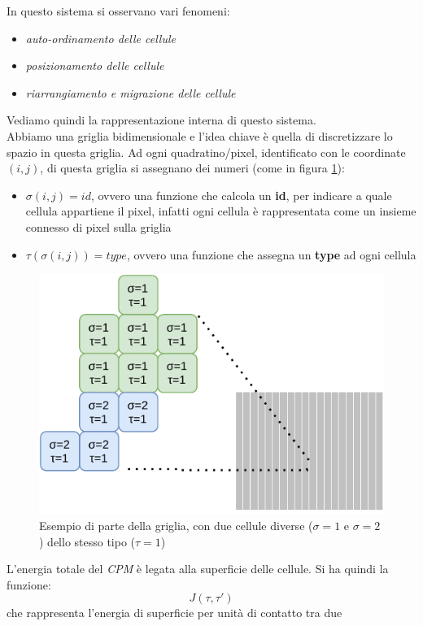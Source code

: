 \documentclass[a4paper,12pt, oneside]{book}
\begin{document}
In questo sistema si osservano vari fenomeni:
\begin{itemize}
  \item \textit{auto-ordinamento delle cellule}
  \item \textit{posizionamento delle cellule}
  \item \textit{riarrangiamento e migrazione delle cellule}
\end{itemize}
Vediamo quindi la rappresentazione interna di questo sistema.\\
Abbiamo una griglia bidimensionale e l'idea chiave è quella di discretizzare lo
spazio in questa griglia. Ad ogni quadratino/pixel, identificato con le
coordinate $(i,j)$, di questa griglia si
assegnano dei numeri (come in figura \ref{fig:grid}):
\begin{itemize}
  \item $\sigma(i,j)=id$, ovvero una funzione che calcola un \textbf{id}, per
  indicare a quale cellula appartiene il pixel, 
  infatti ogni cellula è rappresentata come un insieme connesso di pixel sulla
  griglia 
  \item $\tau(\sigma(i,j))=type$, ovvero una funzione che assegna un
  \textbf{type} ad ogni cellula
\end{itemize}
\begin{figure}
  \centering
  \includegraphics[scale = 1]{img/grid.pdf}
  \caption{Esempio di parte della griglia, con due cellule diverse ($\sigma=1$ e
    $\sigma=2$) dello stesso tipo ($\tau=1$)}
  \label{fig:grid}
\end{figure}
L'energia totale del \textit{CPM} è legata alla superficie delle cellule. Si ha
quindi la funzione:
\[J(\tau,\tau')\]
che rappresenta l'energia di superficie per unità di contatto tra due
\end{document}

